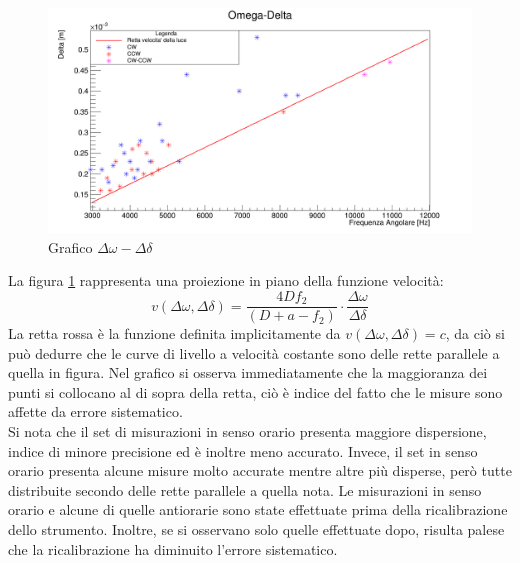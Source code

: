\documentclass{article}
\begin{document}
        \begin{figure}[H]
            \centering
            \includegraphics[scale=0.32]{../images/omega_delta1.png}
            \caption{Grafico $\Delta\omega-\Delta\delta$}
            \label{fig:Omega-Delta}
        \end{figure}
        
        La figura \ref{fig:Omega-Delta} rappresenta una proiezione in piano della funzione velocità:
        \[ v(\Delta \omega,\Delta \delta) = \frac{4Df_2}{(D+a-f_2)} \cdot \frac{\Delta\omega}{\Delta\delta} \]
        La retta rossa è la funzione definita implicitamente da $v(\Delta \omega,\Delta \delta) = c$, da ciò si può dedurre che le curve di livello a velocità costante sono delle rette parallele a quella in figura. 
        Nel grafico si osserva immediatamente che la maggioranza dei punti si collocano al di sopra della retta, 
        ciò è indice del fatto che le misure sono affette da errore sistematico. \\

        Si nota che il set di misurazioni in senso orario presenta maggiore dispersione, indice di minore precisione ed è inoltre meno accurato. 
        Invece, il set in senso orario presenta alcune misure molto accurate mentre altre più disperse, però tutte distribuite secondo delle rette parallele a quella nota. 
        Le misurazioni in senso orario e alcune di quelle antiorarie sono state effettuate prima della ricalibrazione dello strumento. 
        Inoltre, se si osservano solo quelle effettuate dopo, risulta palese che la ricalibrazione ha diminuito l'errore sistematico.
\end{document}
